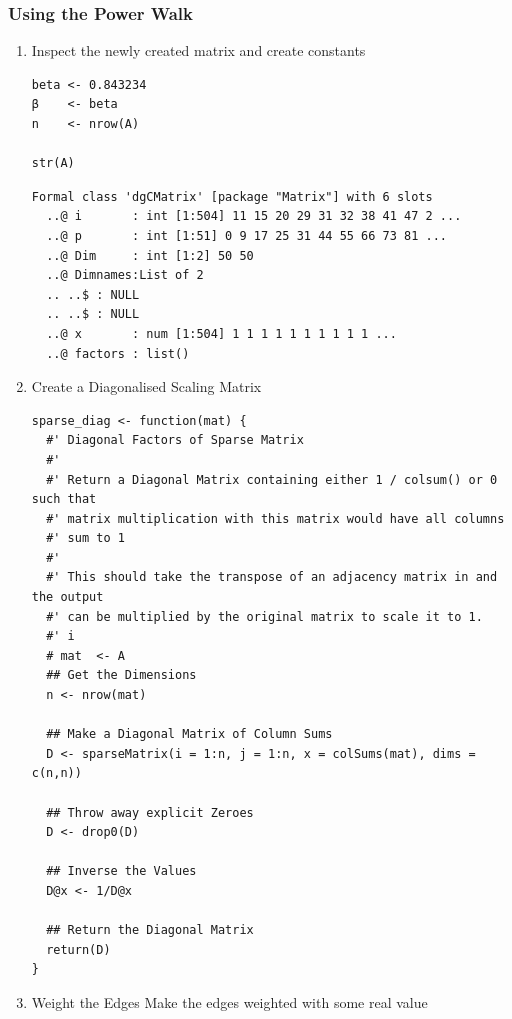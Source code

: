 \documentclass[11pt]{article}
\begin{document}
\subsubsection{Using the Power Walk}
\label{sec:orgd381be5}
\begin{enumerate}
\item Inspect the newly created matrix and create constants
\label{sec:org4406711}

\lstset{language=r,label= ,caption= ,captionpos=b,numbers=none}
\begin{lstlisting}
beta <- 0.843234
β    <- beta
n    <- nrow(A)

str(A)
\end{lstlisting}

\begin{verbatim}
Formal class 'dgCMatrix' [package "Matrix"] with 6 slots
  ..@ i       : int [1:504] 11 15 20 29 31 32 38 41 47 2 ...
  ..@ p       : int [1:51] 0 9 17 25 31 44 55 66 73 81 ...
  ..@ Dim     : int [1:2] 50 50
  ..@ Dimnames:List of 2
  .. ..$ : NULL
  .. ..$ : NULL
  ..@ x       : num [1:504] 1 1 1 1 1 1 1 1 1 1 ...
  ..@ factors : list()
\end{verbatim}

\item Create a Diagonalised Scaling Matrix
\label{sec:orge0f178e}
\lstset{language=r,label= ,caption= ,captionpos=b,numbers=none}
\begin{lstlisting}
sparse_diag <- function(mat) {
  #' Diagonal Factors of Sparse Matrix
  #'
  #' Return a Diagonal Matrix containing either 1 / colsum() or 0 such that
  #' matrix multiplication with this matrix would have all columns
  #' sum to 1
  #'
  #' This should take the transpose of an adjacency matrix in and the output
  #' can be multiplied by the original matrix to scale it to 1.
  #' i
  # mat  <- A
  ## Get the Dimensions
  n <- nrow(mat)

  ## Make a Diagonal Matrix of Column Sums
  D <- sparseMatrix(i = 1:n, j = 1:n, x = colSums(mat), dims = c(n,n))

  ## Throw away explicit Zeroes
  D <- drop0(D)

  ## Inverse the Values
  D@x <- 1/D@x

  ## Return the Diagonal Matrix
  return(D)
}
\end{lstlisting}

\item Weight the Edges
\label{sec:orgd2581ae}
Make the edges weighted with some real value


\end{enumerate}
\end{document}
